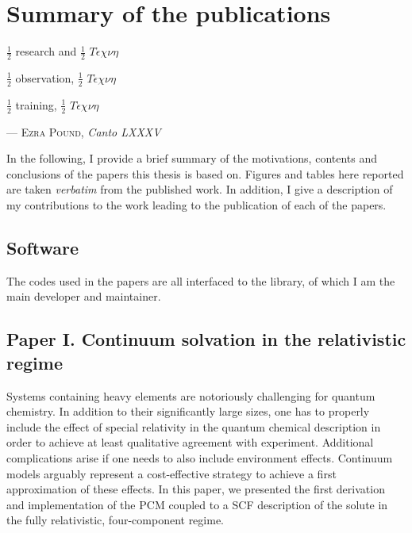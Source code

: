 \chapter{Summary of the publications}\label{ch:publications-summary}

\epigraph{$\frac{1}{2}$ research and $\frac{1}{2}\,\,T\acute{\epsilon}\chi\nu\eta$

          $\frac{1}{2}$ observation, $\frac{1}{2}\,\,T\acute{\epsilon}\chi\nu\eta$

          $\frac{1}{2}$ training, $\frac{1}{2}\,\,T\acute{\epsilon}\chi\nu\eta$}{
  --- \textsc{Ezra Pound}, \textit{Canto LXXXV}}

In the following, I provide a brief summary of the motivations, contents and
conclusions of the papers this thesis is based on.
Figures and tables here reported are taken \emph{verbatim} from the published work.
In addition, I give a description of my contributions to the work leading to
the publication of each of the papers.

\section*{Software}

The codes used in the papers are all interfaced to the \pcmsolver library,
of which I am the main developer and maintainer.

\section*{Paper I. Continuum solvation in the relativistic regime}

Systems containing heavy elements are notoriously challenging for quantum chemistry.
In addition to their significantly large sizes, one has to properly include the
effect of special relativity in the quantum chemical description in order to
achieve at least qualitative agreement with experiment.
Additional complications arise if one needs to also include environment effects.
Continuum models arguably represent a cost-effective strategy to achieve a first
approximation of these effects.
In this paper, we presented the first derivation and implementation of the \acs{PCM}
coupled to a \acs{SCF} description of the solute in the fully relativistic, four-component
regime.

